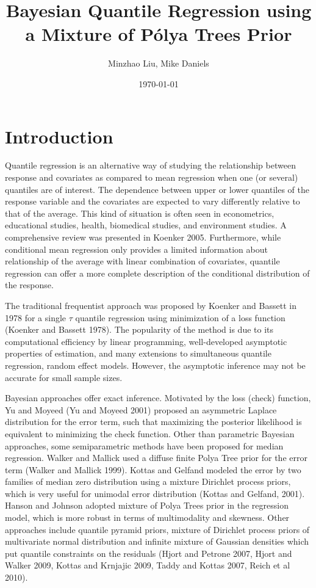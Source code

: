 \documentclass[12pt]{article}
\title{Bayesian Quantile Regression using a  Mixture of P\'{o}lya Trees Prior}
\date{\today}
\author{Minzhao Liu, Mike Daniels}
\begin{document}

\maketitle{}

\section{Introduction}

Quantile regression is an alternative way of studying the relationship
between response and covariates as compared to mean
regression when one (or several)
quantiles are of interest.  The dependence
between upper or lower quantiles of the response variable and the
covariates are expected to vary differently relative to that of the
average. This kind of situation is often seen in econometrics,
educational studies, health, biomedical studies, and environment
studies. A comprehensive review was presented in Koenker
2005. Furthermore, while conditional mean regression only provides a
limited information about relationship of the average with linear
combination of covariates,  quantile regression can offer a more
complete description of the conditional distribution of the response. 

The traditional frequentist approach was proposed by Koenker and
Bassett in 1978 for a single $\tau$ quantile regression using
minimization of a loss function (Koenker and Bassett 1978). The
popularity of the method is due 
to its computational efficiency by linear programming, well-developed
asymptotic properties of estimation, and many extensions to
simultaneous quantile regression, random effect models. However,
the asymptotic inference may not be accurate  for small sample
sizes. 

Bayesian approaches offer exact
inference. Motivated by the loss (check) function, Yu and Moyeed (Yu and Moyeed
2001) proposed an asymmetric Laplace distribution for the error term,
such that maximizing the posterior likelihood  is equivalent to
minimizing the check function. Other than parametric Bayesian
approaches, some semiparametric methods have been proposed for median
regression. Walker and Mallick used a diffuse finite Polya Tree prior
for the error term (Walker and Mallick 1999). Kottas and Gelfand
modeled the error by two families of median zero distribution using a 
mixture Dirichlet process priors, which is very useful for unimodal
error distribution (Kottas and Gelfand, 2001). Hanson and Johnson
adopted mixture of Polya Trees prior in the regression model, which is
more robust in terms of multimodality and skewness. Other approaches
include quantile pyramid priors, mixture of Dirichlet process priors
of multivariate normal distribution and infinite mixture of Gaussian
densities which put quantile constraints on the residuals (Hjort and
Petrone 2007, Hjort and 
Walker 2009, Kottas and Krnjajic 2009, Taddy and Kottas 2007, Reich et
al 2010). 
\end{document}
